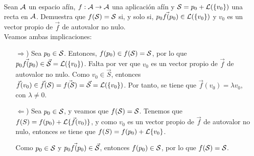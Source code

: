\documentclass[12pt]{article}
\begin{document}
    \begin{ejercicio}[2 puntos]
        Sean $\mathcal{A}$ un espacio afín, $f: \mathcal{A}\rightarrow \mathcal{A}$ una aplicación afín y $\mathcal{S}=p_0+\mathcal{L}(\{v_0\})$ una recta en $\mathcal{A}$. Demuestra que $f(\mathcal{S})=\mathcal{S}$ si, y solo si, $\vec{p_0f(p_0)}\in \mathcal{L}(\{v_0\})$ y $v_0$ es un vector propio de $\vec{f}$ de autovalor no nulo.\\

        Veamos ambas implicaciones:
        \begin{itemize}
            \item [$\Rightarrow$)] Sea $p_0 \in \mathcal{S}$. Entonces, $f(p_0) \in f(\mathcal{S})=\mathcal{S}$, por lo que $\vec{p_0f(p_0)}\in \vec{\mathcal{S}}=\mathcal{L}(\{v_0\})$.
            Falta por ver que $v_0$ es un vector propio de $\vec{f}$ de autovalor no nulo.
            Como $v_0\in \vec{S}$, entonces $\vec{f}(v_0)\in \vec{f}(\mathcal{S})=\vec{f(\mathcal{S})}=\vec{\mathcal{S}}=\mathcal{L}(\{v_0\})$. Por tanto, se tiene que $\vec{f}(v_0)=\lambda v_0$, con $\lambda \neq 0$.
            
            \item [$\Leftarrow$)] Sea $p_0\in \mathcal{S}$, y veamos que $f(\mathcal{S})=\mathcal{S}$.
            Tenemos que $f(S)=f(p_0)+\mathcal{L}\{\vec{f}(v_0)\}$, y como
            $v_0$ es un vector propio de $\vec{f}$ de autovalor no nulo, entonces se tiene que
            $f(S)=f(p_0)+\mathcal{L}\{v_0\}$.
            
            Como $p_0 \in \mathcal{S}$ y $\vec{p_0f(p_0)}\in \vec{\mathcal{S}}$, entonces
            $f(p_0) \in \mathcal{S}$, por lo que $f(\mathcal{S})=\mathcal{S}$.
        \end{itemize}
    \end{ejercicio}
     
\end{document}

